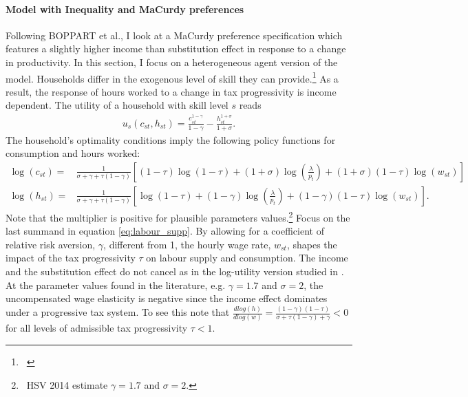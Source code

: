 \paragraph{Model with Inequality and MaCurdy preferences}
Following BOPPART et al., I look at a MaCurdy preference specification which features a slightly higher income than substitution effect in response to a change in productivity. In this section, I focus on a heterogeneous agent version of the model. Households differ in the exogenous level of skill they can provide.\footnote{\  } As a result, the response of hours worked to a change in tax progressivity is income dependent. 
The utility of a household with skill level $s$ reads
\begin{align}
	u_s(c_{st},h_{st})=
	\frac{c_{st}^{1-\gamma}}{1-\gamma}-
	\frac{h_{st}^{1+\sigma}}{1+\sigma}.%
\end{align}
The household's optimality conditions imply the following policy functions for consumption and hours worked:
\begin{align}
	\log(c_{st})=& \frac{1}{\sigma +\gamma +\tau(1-\gamma)}\left[(1-\tau)\log(1-\tau)+(1+\sigma)\log\left(\frac{\lambda}{p_{t}}\right)+(1+\sigma)(1-\tau)\log(w_{st})\right]\\
		\log(h_{st})=& \frac{1}{\sigma+\gamma+\tau(1-\gamma)}\left[\log(1-\tau)+(1-\gamma)\log\left(\frac{\lambda}{p_{t}}\right)+(1-\gamma)(1-\tau)\log(w_{st})\right]\label{eq:labour_supp}.
\end{align}
Note that the multiplier is positive for plausible parameters values.\footnote{\ HSV 2014 estimate $\gamma= 1.7$ and $\sigma=2$.} %
Focus on the last summand in equation \ref{eq:labour_supp}.
By allowing for a coefficient of relative risk aversion, $\gamma$, different from 1, the hourly wage rate, $w_{st}$, shapes the impact of the tax progressivity $\tau$ on labour supply and consumption. The income and the substitution effect do not cancel as in the log-utility version studied in \cite{Heathcote2017OptimalFramework}. 
 At the parameter values found in the literature, e.g. $\gamma= 1.7$ and $\sigma=2$, the uncompensated wage elasticity is negative since the income effect dominates under a progressive tax system.  To see this note that  $\frac{d log(h)}{d log(w)}= \frac{(1-\gamma)(1-\tau)}{\sigma+\tau(1-\gamma)+\gamma}<0$ for all levels of admissible tax progressivity $\tau<1$.  

